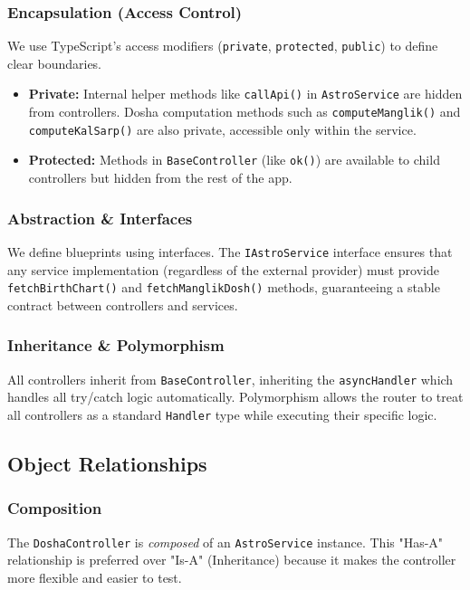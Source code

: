 \documentclass[12pt,a4paper]{article}
\begin{document}
\subsubsection{Encapsulation (Access Control)}
We use TypeScript's access modifiers (\texttt{private}, \texttt{protected}, \texttt{public}) to define clear boundaries.
\begin{itemize}
    \item \textbf{Private:} Internal helper methods like \texttt{callApi()} in \texttt{AstroService} are hidden from controllers. Dosha computation methods such as \texttt{computeManglik()} and \texttt{computeKalSarp()} are also private, accessible only within the service.
    \item \textbf{Protected:} Methods in \texttt{BaseController} (like \texttt{ok()}) are available to child controllers but hidden from the rest of the app.
\end{itemize}

\subsubsection{Abstraction \& Interfaces}
We define blueprints using interfaces. The \texttt{IAstroService} interface ensures that any service implementation (regardless of the external provider) must provide \texttt{fetchBirthChart()} and \texttt{fetchManglikDosh()} methods, guaranteeing a stable contract between controllers and services.

\subsubsection{Inheritance \& Polymorphism}
All controllers inherit from \texttt{BaseController}, inheriting the \texttt{asyncHandler} which handles all try/catch logic automatically. Polymorphism allows the router to treat all controllers as a standard \texttt{Handler} type while executing their specific logic.

\subsection{Object Relationships}

\subsubsection{Composition}
The \texttt{DoshaController} is \textit{composed} of an \texttt{AstroService} instance. This "Has-A" relationship is preferred over "Is-A" (Inheritance) because it makes the controller more flexible and easier to test.
\end{document}
